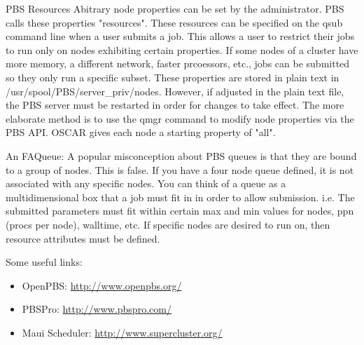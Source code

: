 PBS Resources
Abitrary node properties can be set by the administrator.  PBS calls these
properties "resources".  These resources can be specified on the qsub
command line when a user submits a job.  This allows a user to restrict
their jobs to run only on nodes exhibiting certain properties.  If some
nodes of a cluster have more memory, a different network, faster prcoessors, 
etc., jobs can be submitted so they only run a specific subset.  These
properties are stored in plain text in /usr/spool/PBS/server_priv/nodes.
However, if adjusted in the plain text file, the PBS server must be
restarted in order for changes to take effect.  The more elaborate method
is to use the qmgr command to modify node properties via the PBS API.
OSCAR gives each node a starting property of "all".

An FAQueue:
A popular misconception about PBS queues is that they are bound to a group
of nodes.  This is false.  If you have a four node queue defined, it is
not associated with any specific nodes.  You can think of a queue as a
multidimensional box that a job must fit in in order to allow submission.
i.e.  The submitted parameters must fit within certain max and min values
for nodes, ppn (procs per node), walltime, etc.  If specific nodes are
desired to run on, then resource attributes must be defined.

Some useful links:

\begin{itemize}
\item OpenPBS: \url{http://www.openpbs.org/}

\item PBSPro: \url{http://www.pbspro.com/}

\item Maui Scheduler: \url{http://www.supercluster.org/}
\end{itemize}

